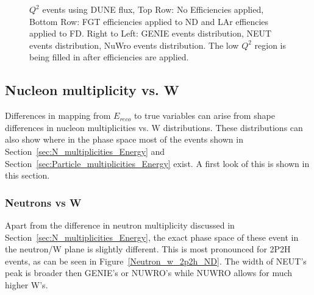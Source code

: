\documentclass[12pt]{article}
\begin{document}
\begin{figure}[h]
\endminipage
\caption{$Q^2$ events using DUNE flux, Top Row: No Efficiencies applied, Bottom Row: FGT efficiencies applied to ND and LAr effiencies applied to FD. Right to Left: GENIE events distribution, NEUT events distribution, NuWro events distribution. The low $Q^2$ region is being filled in after efficiencies are applied.}
\label{fig:Q2_numu_CCOther_events}
\end{figure}
\FloatBarrier

\subsection{Nucleon multiplicity vs. W}
\label{sec:Nucleon_multi_w}

Differences in mapping from $E_{reco}$ to true variables can arise from shape differences in nucleon multiplicities vs. W distributions. 
These distributions can also show where in the phase space most of the events shown in Section~\ref{sec:N_multiplicities_Energy} and Section~\ref{sec:Particle_multiplicities_Energy} exist.  A first look of this is shown in this section.

\subsubsection{Neutrons vs W}

Apart from the difference in neutron multiplicity discussed in Section~\ref{sec:N_multiplicities_Energy}, the exact phase space of these event in the neutron/W plane is slightly different.  
This is most pronounced for 2P2H events, as can be seen in Figure~\ref{Neutron_w_2p2h_ND}. 
The width of NEUT's peak is broader then GENIE's or NUWRO's while NUWRO allows for much higher W's.
\end{document}
